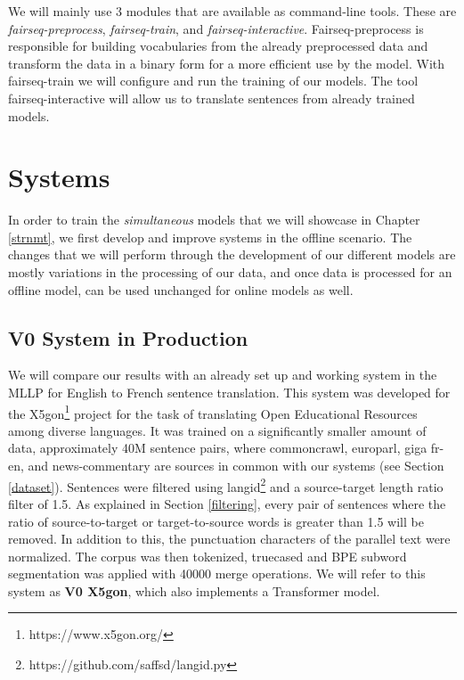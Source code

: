 \documentclass[11pt,english,listoffigures,listoftables]{tfgetsinf}
\begin{document}
We will mainly use 3 modules that are available as command-line tools. These are \textit{fairseq-preprocess}, \textit{fairseq-train}, and \textit{fairseq-interactive}. Fairseq-preprocess is responsible for building vocabularies from the already preprocessed data and transform the data in a binary form for a more efficient use by the model. With fairseq-train we will configure and run the training of our models. The tool fairseq-interactive will allow us to translate sentences from already trained models.




\section{Systems}
In order to train the \textit{simultaneous} models that we will showcase in Chapter \ref{strnmt}, we first develop and improve systems in the offline scenario. The changes that we will perform through the development of our different models are mostly variations in the processing of our data, and once data is processed for an offline model, can be used unchanged for online models as well.

\subsection{V0 System in Production}
We will compare our results with an already set up and working system in the MLLP for English to French sentence translation. This system was developed for the X5gon\footnote{https://www.x5gon.org/} project for the task of translating Open Educational Resources among diverse languages. It was trained on a significantly smaller amount of data, approximately 40M sentence pairs, where  commoncrawl, europarl, giga fr-en, and news-commentary are sources in common with our systems (see Section \ref{dataset}).
Sentences were filtered using langid\footnote{https://github.com/saffsd/langid.py} and a source-target length ratio filter of 1.5. 
As explained in Section \ref{filtering}, every pair of sentences where the ratio of source-to-target or target-to-source words is greater than 1.5 will be removed. 
In addition to this, the punctuation characters of the parallel text were normalized. The corpus was then tokenized, truecased and BPE subword segmentation was applied with 40000 merge operations.
We will refer to this system as \textbf{V0 X5gon}, which also implements a Transformer model. 
\end{document}
